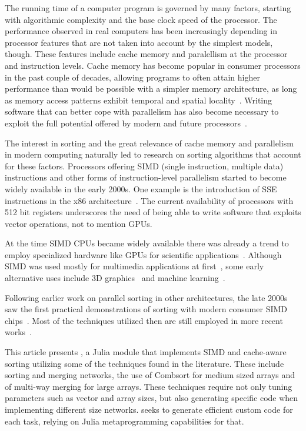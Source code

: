 \documentclass{juliacon}
\begin{document}
The running time of a computer program is governed by many factors, starting with algorithmic complexity and the base clock speed of the processor. The performance observed in real computers has been increasingly depending in processor features that are not taken into account by the simplest models, though. These features include cache memory and paralellism at the processor and instruction levels. Cache memory has become popular in consumer processors in the past couple of decades, allowing programs to often attain higher performance than would be possible with a simpler memory architecture, as long as memory access patterns exhibit temporal and spatial locality~\cite[Chapter 3]{Drepper07whatevery}. Writing software that can better cope with parallelism has also become necessary to exploit the full potential offered by modern and future processors~\cite{wilson2018}.

The interest in sorting and the great relevance of cache memory and parallelism in modern computing naturally led to research on sorting algorithms that account for these factors. Processors offering SIMD (single instruction, multiple data) instructions and other forms of instruction-level parallelism started to become widely available in the early 2000s. One example is the introduction of SSE instructions in the x86 architecture~\cite[Chapter 1]{kusswurm18}. The current availability of processors with 512 bit registers underscores the need of being able to write software that exploits vector operations, not to mention GPUs.

At the time SIMD CPUs became widely available there was already a trend to employ specialized hardware like GPUs for scientific applications~\cite{larsen2001fast,DBLP:conf/micro/ThompsonHO02}. Although SIMD was used mostly for multimedia applications at first~\cite{CHEN2006509,DBLP:journals/mam/SlingerlandS05}, some early alternative uses include 3D graphics~\cite{DBLP:conf/pcm/MaY02} and machine learning~\cite{DBLP:conf/europar/StreyB01}.

Following earlier work on parallel sorting in other architectures, the late 2000s saw the first practical demonstrations of sorting with modern consumer SIMD chips~\cite{DBLP:conf/IEEEpact/InoueMKN07,DBLP:journals/pvldb/ChhuganiNLMHCBKD08}. Most of the techniques utilized then are still employed in more recent works~\cite{DBLP:journals/pvldb/BalkesenATO13,DBLP:journals/pvldb/InoueT15}.

This article presents \chipsort, a Julia module that implements SIMD and cache-aware sorting utilizing some of the techniques found in the literature. These include sorting and merging networks, the use of Combsort for medium sized arrays and of multi-way merging for large arrays. These techniques require not only tuning parameters such as vector and array sizes, but also generating specific code when implementing different size networks. \chipsort seeks to generate efficient custom code for each task, relying on Julia metaprogramming capabilities for that.
\end{document}
